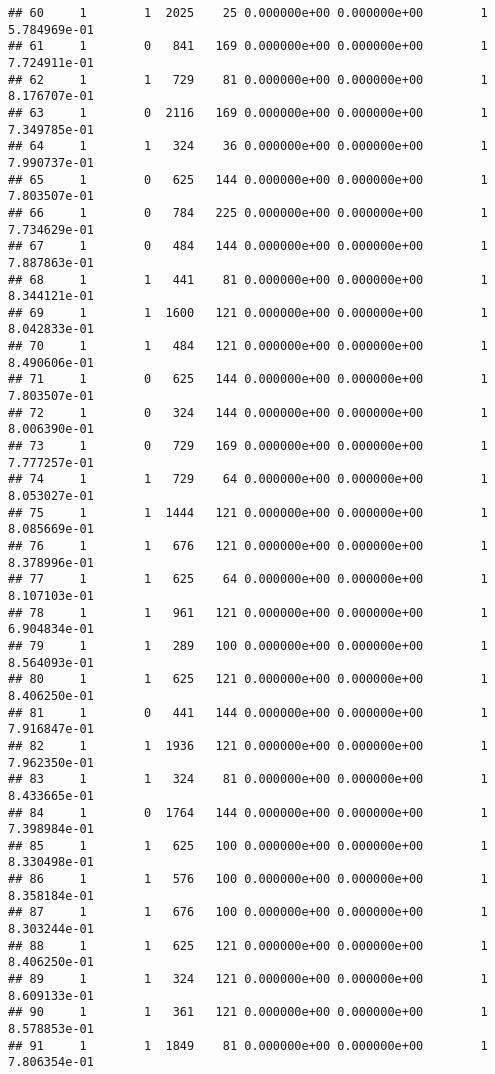 \documentclass[
]{article}
\begin{document}
\begin{enumerate}
\begin{verbatim}
## 60     1        1  2025    25 0.000000e+00 0.000000e+00        1  5.784969e-01
## 61     1        0   841   169 0.000000e+00 0.000000e+00        1  7.724911e-01
## 62     1        1   729    81 0.000000e+00 0.000000e+00        1  8.176707e-01
## 63     1        0  2116   169 0.000000e+00 0.000000e+00        1  7.349785e-01
## 64     1        1   324    36 0.000000e+00 0.000000e+00        1  7.990737e-01
## 65     1        0   625   144 0.000000e+00 0.000000e+00        1  7.803507e-01
## 66     1        0   784   225 0.000000e+00 0.000000e+00        1  7.734629e-01
## 67     1        0   484   144 0.000000e+00 0.000000e+00        1  7.887863e-01
## 68     1        1   441    81 0.000000e+00 0.000000e+00        1  8.344121e-01
## 69     1        1  1600   121 0.000000e+00 0.000000e+00        1  8.042833e-01
## 70     1        1   484   121 0.000000e+00 0.000000e+00        1  8.490606e-01
## 71     1        0   625   144 0.000000e+00 0.000000e+00        1  7.803507e-01
## 72     1        0   324   144 0.000000e+00 0.000000e+00        1  8.006390e-01
## 73     1        0   729   169 0.000000e+00 0.000000e+00        1  7.777257e-01
## 74     1        1   729    64 0.000000e+00 0.000000e+00        1  8.053027e-01
## 75     1        1  1444   121 0.000000e+00 0.000000e+00        1  8.085669e-01
## 76     1        1   676   121 0.000000e+00 0.000000e+00        1  8.378996e-01
## 77     1        1   625    64 0.000000e+00 0.000000e+00        1  8.107103e-01
## 78     1        1   961   121 0.000000e+00 0.000000e+00        1  6.904834e-01
## 79     1        1   289   100 0.000000e+00 0.000000e+00        1  8.564093e-01
## 80     1        1   625   121 0.000000e+00 0.000000e+00        1  8.406250e-01
## 81     1        0   441   144 0.000000e+00 0.000000e+00        1  7.916847e-01
## 82     1        1  1936   121 0.000000e+00 0.000000e+00        1  7.962350e-01
## 83     1        1   324    81 0.000000e+00 0.000000e+00        1  8.433665e-01
## 84     1        0  1764   144 0.000000e+00 0.000000e+00        1  7.398984e-01
## 85     1        1   625   100 0.000000e+00 0.000000e+00        1  8.330498e-01
## 86     1        1   576   100 0.000000e+00 0.000000e+00        1  8.358184e-01
## 87     1        1   676   100 0.000000e+00 0.000000e+00        1  8.303244e-01
## 88     1        1   625   121 0.000000e+00 0.000000e+00        1  8.406250e-01
## 89     1        1   324   121 0.000000e+00 0.000000e+00        1  8.609133e-01
## 90     1        1   361   121 0.000000e+00 0.000000e+00        1  8.578853e-01
## 91     1        1  1849    81 0.000000e+00 0.000000e+00        1  7.806354e-01

\end{verbatim}
\end{enumerate}
\end{document}
